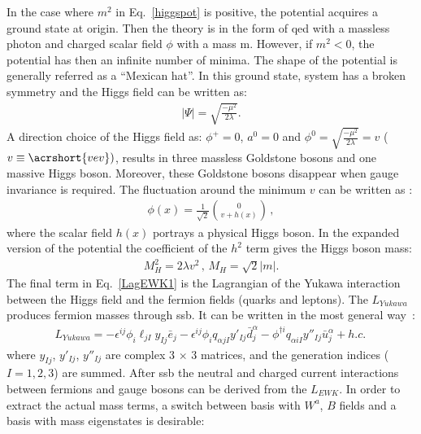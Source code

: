 In the case where $m^2$ in Eq.~\ref{higgspot} is positive, the potential acquires a ground state at origin. Then the theory is in the form of \acrshort{qed} with a massless photon and charged scalar field $\phi$ with a mass m. However, if $m^2<0$, the potential has then an infinite number of minima. The shape of the potential is generally referred as a “Mexican hat”. In this ground state, system has a broken symmetry and the Higgs field can be written as:
\begin{eqnarray}
\label{higgsfield_vacuum}
	|\Psi|= \sqrt{\frac{-\mu^2}{2\lambda}}.
\end{eqnarray}
A direction choice of the Higgs field as: $\phi^+=0$, $a^0=0$ and $\phi^0=\sqrt{\frac{-\mu^2}{2\lambda}}=v$ ($v\equiv \acrshort{vev})$, results in three massless Goldstone bosons and one massive Higgs boson. Moreover, these Goldstone bosons disappear when gauge invariance is required. The fluctuation around the minimum $v$ can be written as :
\begin{eqnarray}
\label{higgsfield_vacuum_dir}
	{\phi(x)}= \frac{1}{\sqrt{2}}{0 \choose v+h(x)}\,,
\end{eqnarray}
where the scalar field $h(x)$ portrays a physical Higgs boson. 
In the expanded version of the potential the coefficient of the $h^2$ term gives the Higgs boson mass:
\begin{eqnarray}
\label{higgsfield_vacuum_dir}
	{M^2_H}= {2\lambda v^2 \,,\,M_H=\sqrt{2}|m|}.
\end{eqnarray}
The final term in Eq.~\ref{LagEWK1}  is the Lagrangian of the Yukawa interaction between the Higgs field and the fermion fields (quarks and leptons). The $L_{Yukawa}$ produces fermion masses through \acrfull{ssb}. It can be written in the most general way~\cite{srednicki}:
\begin{eqnarray}
\label{LagYukawa1}
{L_{Yukawa} = -\epsilon^{ij}\phi_i\ell_{jI}y_{Ij}\bar{e}_j - \epsilon^{ij}\phi_iq_{\alpha jI}y'_{Ij}\bar{d}_{j}^\alpha - \phi^{\dagger i}q_{\alpha iI}y''_{Ij}\bar{u}_{j}^\alpha +h.c.}\,
\end{eqnarray}
where $y_{Ij}$, $y'_{Ij}$, $y''_{Ij}$ are complex $3\,\times\,3$ matrices, and the generation indices ($I=1,2,3$) are summed.
After \acrshort{ssb} the neutral and charged current interactions between fermions and gauge bosons can be derived from the $L_{EWK}$.  In order to extract the actual mass terms, a switch between basis with $W^a$, $B$ fields and a basis with mass eigenstates is desirable:

